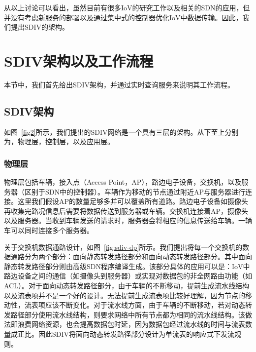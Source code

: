 \documentclass{ctexart}
\begin{document}
从以上讨论可以看出，虽然目前有很多IoV的研究工作以及相关的SDN的应用，但并没有考虑新服务的部署以及通过集中式的控制器优化IoV中数据传输。因此，我们提出SDIV的架构。


\section{SDIV架构以及工作流程} 

本节中，我们首先给出SDIV架构，并通过实时查询服务来说明其工作流程。


\subsection{SDIV架构}

如图~\ref{fig2}所示，我们提出的SDIV网络是一个具有三层的架构。从下至上分别为，物理层，控制层，以及应用层。


\subsubsection{物理层}

物理层包括车辆，接入点（Access Point，AP），路边电子设备，交换机，以及服务器（区别于SDN中的控制器）。车辆作为移动的节点通过附近AP与服务器进行连接。这里我们假设AP的数量足够多并可以覆盖所有道路。路边电子设备如摄像头再收集完路况信息后需要将数据传送到服务器或车辆。交换机连接着AP，摄像头以及服务器。当收到车辆发送的请求时，服务器会将相应的信息传送给车辆。一辆车可以同时连接多个服务器。

关于交换机数据通路设计，如图~\ref{fig:sdiv-dp}所示。我们提出将每一个交换机的数据通路分为两个部分：面向静态转发路径部分和面向动态转发路径部分。其中面向静态转发路径部分则由高级SDN程序编译生成。该部分具体的应用可以是：IoV中路边设备之间的通信（如摄像头到服务器）或实现对数据包的非全网路由功能（如ACL）。对于面向动态转发路径部分，由于车辆的不断移动，提前生成流水线结构以及流表项并不是一个好的设计。无法提前生成流表项比较好理解，因为节点的移动性，流表项应该不断变化。对于流水线方面，由于车辆的不断移动，若对动态转发路径部分使用流水线结构，则要求网络中所有节点都为相同的流水线结构。该做法即浪费网络资源，也会提高数据包时延，因为数据包经过流水线的时间与流表数量成正比。因此SDIV将面向动态转发路径部分设计为单流表的响应式下发流规则。
\end{document}
